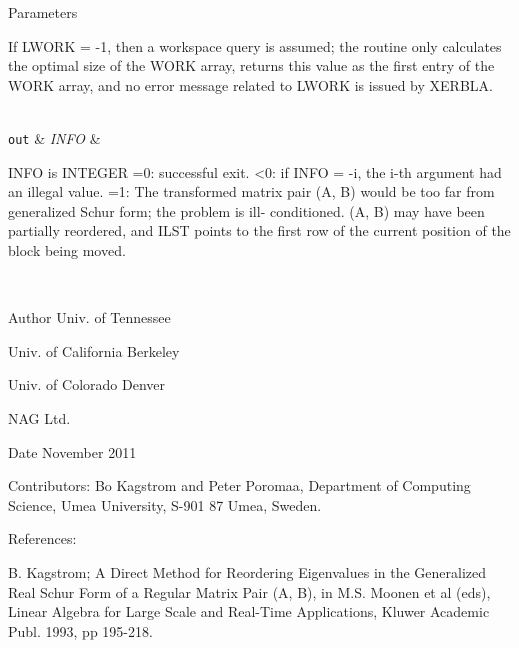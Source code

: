 \begin{DoxyParams}[1]{Parameters}
\begin{DoxyVerb}
          If LWORK = -1, then a workspace query is assumed; the routine
          only calculates the optimal size of the WORK array, returns
          this value as the first entry of the WORK array, and no error
          message related to LWORK is issued by XERBLA.\end{DoxyVerb}
\\
\hline
\mbox{\tt out}  & {\em I\+N\+F\+O} & \begin{DoxyVerb}          INFO is INTEGER
           =0:  successful exit.
           <0:  if INFO = -i, the i-th argument had an illegal value.
           =1:  The transformed matrix pair (A, B) would be too far
                from generalized Schur form; the problem is ill-
                conditioned. (A, B) may have been partially reordered,
                and ILST points to the first row of the current
                position of the block being moved.\end{DoxyVerb}
 \\
\hline
\end{DoxyParams}
\begin{DoxyAuthor}{Author}
Univ. of Tennessee 

Univ. of California Berkeley 

Univ. of Colorado Denver 

N\+A\+G Ltd. 
\end{DoxyAuthor}
\begin{DoxyDate}{Date}
November 2011 
\end{DoxyDate}
\begin{DoxyParagraph}{Contributors\+: }
Bo Kagstrom and Peter Poromaa, Department of Computing Science, Umea University, S-\/901 87 Umea, Sweden. 
\end{DoxyParagraph}
\begin{DoxyParagraph}{References\+: }
\begin{DoxyVerb}  [1] B. Kagstrom; A Direct Method for Reordering Eigenvalues in the
      Generalized Real Schur Form of a Regular Matrix Pair (A, B), in
      M.S. Moonen et al (eds), Linear Algebra for Large Scale and
      Real-Time Applications, Kluwer Academic Publ. 1993, pp 195-218.\end{DoxyVerb}
 
\end{DoxyParagraph}
